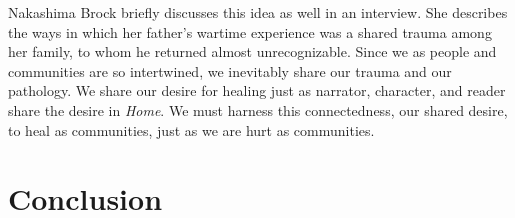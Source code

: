 \documentclass[12pt]{article}
\begin{document}
Nakashima Brock briefly discusses this idea as well in an interview. She
describes the ways in which her father's wartime experience was a shared trauma
among her family, to whom he returned almost
unrecognizable.\autocite{Brock15} Since we as people and communities are
so intertwined, we inevitably share our trauma and our pathology. We share our
desire for healing just as narrator, character, and reader share the desire in
\emph{Home}. We must harness this connectedness, our shared desire, to heal as
communities, just as we are hurt as communities.



\section{Conclusion}
\end{document}
